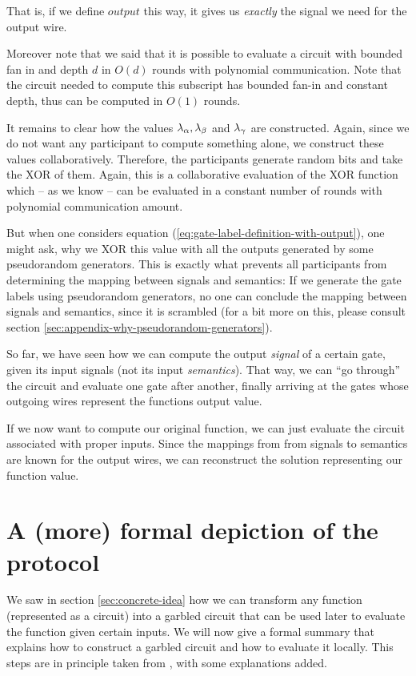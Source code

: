 \message{ !name(seminar.tex)}\documentclass{llncs}
\begin{document}
That is, if we define $output$ this way, it gives us \emph{exactly} the signal we need for the output wire.

Moreover note that we said that it is possible to evaluate a circuit with bounded fan in and depth $d$ in $O(d)$ rounds with polynomial communication. Note that the circuit needed to compute this subscript has bounded fan-in and constant depth, thus can be computed in $O(1)$ rounds.

It remains to clear how the values $\lambda_\alpha,\lambda_\beta$ and $\lambda_\gamma$ are constructed. Again, since we do not want any participant to compute something alone, we construct these values collaboratively. Therefore, the participants generate random bits and take the XOR of them. Again, this is a collaborative evaluation of the XOR function which -- as we know -- can be evaluated in a constant number of rounds with polynomial communication amount.

But when one considers equation (\ref{eq:gate-label-definition-with-output}), one might ask, why we XOR this value with all the outputs generated by some pseudorandom generators. This is exactly what prevents all participants from determining the mapping between signals and semantics: If we generate the gate labels using pseudorandom generators, no one can conclude the mapping between signals and semantics, since it is scrambled (for a bit more on this, please consult section \ref{sec:appendix-why-pseudorandom-generators}). 

So far, we have seen how we can compute the output \emph{signal} of a certain gate, given its input signals (not its input \emph{semantics}). That way, we can ``go through'' the circuit and evaluate one gate after another, finally arriving at the gates whose outgoing wires represent the functions output value.

If we now want to compute our original function, we can just evaluate the circuit associated with proper inputs. Since the mappings from from signals to semantics are known for the output wires, we can reconstruct the solution representing our function value.

\section{A (more) formal depiction of the protocol}
\label{sec:formal-description}

We saw in section \ref{sec:concrete-idea} how we can transform any function (represented as a circuit) into a garbled circuit that can be used later to evaluate the function given certain inputs. We will now give a formal summary that explains how to construct a garbled circuit and how to evaluate it locally. This steps are in principle taken from \cite{Rogaway:1991:RCS:888502}, with some explanations added. 
\end{document}
